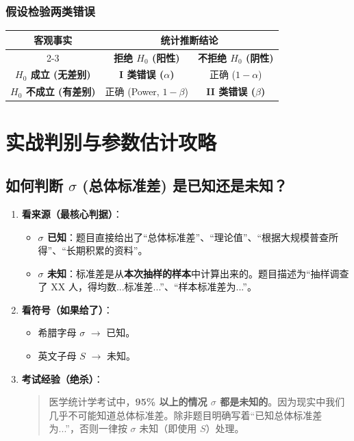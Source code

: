 \documentclass[lang=cn,10pt]{elegantbook}
\begin{document}
\subsection{假设检验两类错误}
\begin{table}[htbp]
    \centering
    \small
    \begin{tabular}{|c|c|c|}
        \hline
        \multirow{2}{*}{\textbf{客观事实}} & \multicolumn{2}{c|}{\textbf{统计推断结论}} \\
        \cline{2-3}
         & \textbf{拒绝 $H_0$ (阳性)} & \textbf{不拒绝 $H_0$ (阴性)} \\
        \hline
        \textbf{$H_0$ 成立 (无差别)} & \textbf{I 类错误 ($\alpha$)} & 正确 ($1-\alpha$) \\
        \hline
        \textbf{$H_0$ 不成立 (有差别)} & 正确 (Power, $1-\beta$) & \textbf{II 类错误 ($\beta$)} \\
        \hline
    \end{tabular}
\end{table}



\chapter{实战判别与参数估计攻略}

\section{如何判断 $\sigma$ (总体标准差) 是已知还是未知？}

\begin{enumerate}
    \item \textbf{看来源（最核心判据）}：
    \begin{itemize}
        \item \textbf{$\sigma$ 已知}：题目直接给出了“总体标准差”、“理论值”、“根据大规模普查所得”、“长期积累的资料”。
        \item \textbf{$\sigma$ 未知}：标准差是从\textbf{本次抽样的样本}中计算出来的。题目描述为“抽样调查了 XX 人，得均数...标准差...”、“样本标准差为...”。
    \end{itemize}
    
    \item \textbf{看符号（如果给了）}：
    \begin{itemize}
        \item 希腊字母 $\sigma$ $\rightarrow$ 已知。
        \item 英文子母 $S$ $\rightarrow$ 未知。
    \end{itemize}

    \item \textbf{考试经验（绝杀）}：
    \begin{quote}
        医学统计学考试中，\textbf{95\% 以上的情况 $\sigma$ 都是未知的}。因为现实中我们几乎不可能知道总体标准差。除非题目明确写着“已知总体标准差为...”，否则一律按 $\sigma$ 未知（即使用 $S$）处理。
    \end{quote}
\end{enumerate}
\end{document}
